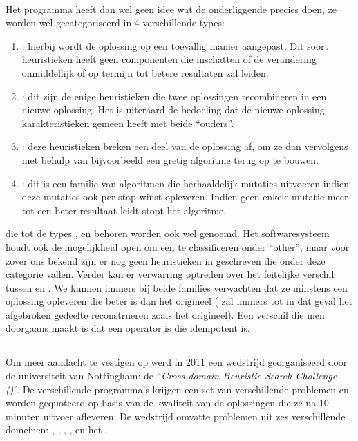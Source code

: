 \paragraph{}
Het programma heeft dan wel geen idee wat de onderliggende \abllhn{} precies doen, ze worden wel gecategoriseerd in 4 verschillende types:
\begin{enumerate}
 \item \emph{\abmt{}}: hierbij wordt de oplossing op een toevallig manier aangepast. Dit soort heuristieken heeft geen componenten die inschatten of de verandering onmiddellijk of op termijn tot betere resultaten zal leiden.
 \item \emph{\abco{}}: dit zijn de enige heuristieken die twee oplossingen recombineren in een nieuwe oplossing. Het is uiteraard de bedoeling dat de nieuwe oplossing karakteristieken gemeen heeft met beide ``ouders''.
 \item \emph{\abrr{}}: deze heuristieken breken een deel van de oplossing af, om ze dan vervolgens met behulp van bijvoorbeeld een gretig algoritme terug op te bouwen.
 \item \emph{\abls{}}: dit is een familie van algoritmen die herhaaldelijk mutaties uitvoeren indien deze mutaties ook per stap winst opleveren. Indien geen enkele mutatie meer tot een beter resultaat leidt stopt het algoritme.
\end{enumerate}
\abllhn[L]{} die tot de types \abmt{}, \abco{} en \abrr{} behoren worden ook wel \abpts{} genoemd. Het softwaresysteem houdt ook de mogelijkheid open om een \abllh{} te classificeren onder ``other'', maar voor zover ons bekend zijn er nog geen heuristieken in \abhf{} geschreven die onder deze categorie vallen. Verder kan er verwarring optreden over het feitelijke verschil tussen \abrr{} en \abls{}. We kunnen immers bij beide families verwachten dat ze minstens een oplossing opleveren die beter is dan het origineel (\abrr{} zal immers tot in dat geval het afgebroken gedeelte reconstrueren zoals het origineel). Een verschil die men doorgaans maakt is dat \abls{} een operator is die idempotent is.

\subsection{\abchescy{}}

Om meer aandacht te vestigen op \abhf{} werd in 2011 een wedstrijd georganiseerd door de universiteit van Nottingham: de ``\emph{Cross-domain Heuristic Search Challenge (\abchescy)}''\cite{Burke:2011:CHS:2177360.2177415}. De verschillende programma's krijgen een set van verschillende problemen en worden gequoteerd op basis van de kwaliteit van de oplossingen die ze na 10 minuten uitvoer afleveren.%
De wedstrijd omvatte problemen uit zes verschillende domeinen: , , , ,  en het .

